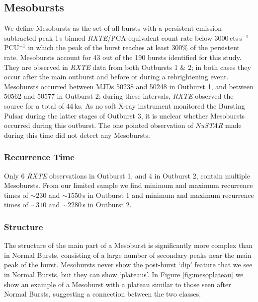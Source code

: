 \subsection{Mesobursts}

\par We define Mesobursts as the set of all bursts with a persistent-emission-subtracted peak 1\,s binned \textit{RXTE}/PCA-equivalent count rate below 3000\,cts\,s$^{-1}$\,PCU$^{-1}$ in which the peak of the burst reaches at least $300\%$ of the persistent rate.  Mesobursts account for 43 out of the 190 bursts identified for this study.  They are observed in \textit{RXTE} data from both Outbursts 1 \& 2; in both cases they occur after the main outburst and before or during a rebrightening event.  Mesobursts occurred between MJDs 50238 and 50248 in Outburst 1, and between 50562 and 50577 in Outburst 2; during these intervals, \textit{RXTE} observed the source for a total of 44\,ks.  As no soft X-ray instrument monitored the Bursting Pulsar during the latter stages of Outburst 3, it is unclear whether Mesobursts occurred during this outburst.  The one pointed observation of \textit{NuSTAR} made during this time did not detect any Mesobursts.

\subsubsection{Recurrence Time}

\par Only 6 \textit{RXTE} observations in Outburst 1, and 4 in Outburst 2, contain multiple Mesobursts.  From our limited sample we find minimum and maximum recurrence times of $\sim230$ and $\sim1550$\,s in Outburst 1 and minimum and maximum recurrence times of $\sim310$ and $\sim2280$\,s in Outburst 2.

\subsubsection{Structure}

\par The structure of the main part of a Mesoburst is significantly more complex than in Normal Bursts, consisting of a large number of secondary peaks near the main peak of the burst.  Mesobursts never show the post-burst `dip' feature that we see in Normal Bursts, but they can show `plateaus'.  In Figure \ref{fig:mesoplateau} we show an example of a Mesoburst with a plateau similar to those seen after Normal Bursts, suggesting a connection between the two classes.


